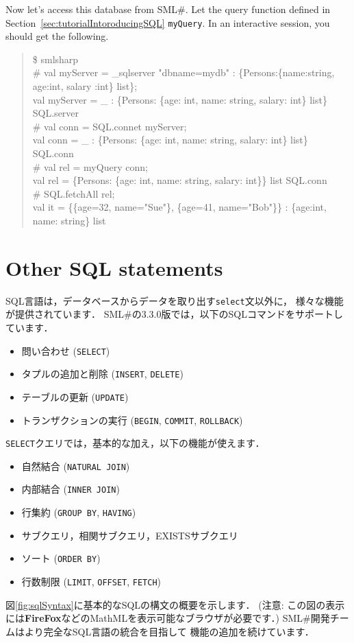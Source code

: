 \documentclass{jbook}
\newcommand{\txt}[2]{#2}
\newcommand{\smlsharp}{SML\#}
\newcommand{\version}{3.3.0}
\newenvironment{program}{\begin{quote}\begin{tt}}%
                        {\end{tt}\end{quote}}
\begin{document}
	Now let's access this database from \smlsharp{}.
	Let the query function defined in Section~\ref{sec:tutorialIntoroducingSQL}
{\tt myQuery}.
	In an interactive session, you should get the following.
\begin{program}
\$ smlsharp\\
\# val myServer = \_sqlserver "dbname=mydb" : \{Persons:\{name:string, age:int, salary :int\} list\};\\
val myServer = \_ : \{Persons: \{age: int, name: string, salary: int\} list\} SQL.server\\
\# val conn = SQL.connet myServer;\\
val conn = \_ : \{Persons: \{age: int, name: string, salary: int\} list\} SQL.conn\\
\# val rel = myQuery conn;\\
val rel = \{Persons: \{age: int, name: string, salary: int\}\} list SQL.conn\\
\# SQL.fetchAll rel;\\
val it = \{\{age=32, name="Sue"\}, \{age=41, name="Bob"\}\} : \{age:int, name: string\} list
\end{program}
\fi%

\section{\txt{その他のSQL文}{Other SQL statements}}
\label{sec:tutorialOtherSQLElement}

\ifjp%
	SQL言語は，データベースからデータを取り出す{\tt select}文以外に，
様々な機能が提供されています．
	\smlsharp{}の\version{}版では，以下のSQLコマンドをサポートしています．
\begin{itemize}
\item 問い合わせ ({\tt SELECT})
\item タプルの追加と削除 ({\tt INSERT}, {\tt DELETE}) 
\item テーブルの更新 ({\tt UPDATE})
\item トランザクションの実行 ({\tt BEGIN}, {\tt COMMIT}, {\tt ROLLBACK})
\end{itemize}
	{\tt SELECT}クエリでは，基本的な加え，以下の機能が使えます．
\begin{itemize}
\item 自然結合 ({\tt NATURAL JOIN})
\item 内部結合 ({\tt INNER JOIN})
\item 行集約 ({\tt GROUP BY}, {\tt HAVING})
\item サブクエリ，相関サブクエリ，EXISTSサブクエリ
\item ソート ({\tt ORDER BY})
\item 行数制限 ({\tt LIMIT}, {\tt OFFSET}, {\tt FETCH})
\end{itemize}
	図\ref{fig:sqlSyntax}に基本的なSQLの構文の概要を示します．
	(注意: この図の表示には{\bf FireFox}などのMathMLを表示可能なブラウザが必要です．)
	\smlsharp{}開発チームはより完全なSQL言語の統合を目指して
機能の追加を続けています．
\end{document}
